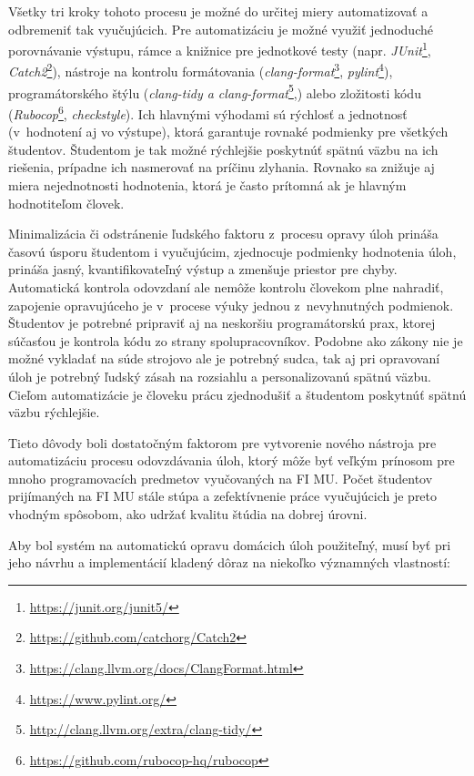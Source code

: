 \documentclass[
  digital, %
  oneside, %
  table,   %
  lof,     %
  lot,   %
]{fithesis3}
\begin{document}
Všetky tri kroky tohoto procesu je možné do určitej miery automatizovať a odbremeniť tak vyučujúcich. Pre automatizáciu je možné využiť jednoduché porovnávanie výstupu, rámce a knižnice pre jednotkové testy (napr. \emph{JUnit}\footnote{\url{https://junit.org/junit5/}}, \emph{Catch2}\footnote{\url{https://github.com/catchorg/Catch2}}), nástroje na kontrolu formátovania (\emph{clang-format}\footnote{\url{https://clang.llvm.org/docs/ClangFormat.html}}, \textit{pylint}\footnote{\url{https://www.pylint.org/}}), programátorského štýlu (\textit{clang-tidy a clang-format}\footnote{\url{http://clang.llvm.org/extra/clang-tidy/}},) alebo zložitosti kódu (\textit{Rubocop}\footnote{\url{https://github.com/rubocop-hq/rubocop}}, \textit{checkstyle}). Ich hlavnými výhodami sú rýchlosť a jednotnosť (v~hodnotení aj vo výstupe), ktorá garantuje rovnaké podmienky pre všetkých študentov. Študentom je tak možné rýchlejšie poskytnúť spätnú väzbu na ich riešenia, prípadne ich nasmerovať na príčinu zlyhania. Rovnako sa znižuje aj miera nejednotnosti hodnotenia, ktorá je často prítomná ak je hlavným hodnotiteľom človek.

Minimalizácia či odstránenie ľudského faktoru z~procesu opravy úloh prináša časovú úsporu študentom i vyučujúcim, zjednocuje podmienky hodnotenia úloh, prináša jasný, kvantifikovateľný výstup a zmenšuje priestor pre chyby. Automatická kontrola odovzdaní ale nemôže kontrolu človekom plne nahradiť, zapojenie opravujúceho je v~procese výuky jednou z~nevyhnutných podmienok. Študentov je potrebné pripraviť aj na neskoršiu programátorskú prax, ktorej súčasťou je kontrola kódu zo strany spolupracovníkov\cite{code_reviews_atlassian}. Podobne ako zákony nie je možné vykladať na súde strojovo ale je potrebný sudca, tak aj pri opravovaní úloh je potrebný ľudský zásah na rozsiahlu a personalizovanú spätnú väzbu\cite{code-feedback}. Cieľom automatizácie je človeku prácu zjednodušiť a študentom poskytnúť spätnú väzbu rýchlejšie.

Tieto dôvody boli dostatočným faktorom pre vytvorenie nového nástroja pre automatizáciu procesu odovzdávania úloh, ktorý môže byť veľkým prínosom pre mnoho programovacích predmetov vyučovaných na FI MU. Počet študentov prijímaných na FI MU stále stúpa a zefektívnenie práce vyučujúcich je preto vhodným spôsobom, ako udržať kvalitu štúdia na dobrej úrovni.

Aby bol systém na automatickú opravu domácich úloh použiteľný, musí byť pri jeho návrhu a implementácií kladený dôraz na niekoľko významných vlastností\cite{obrien-attributes-soa}:
\end{document}

